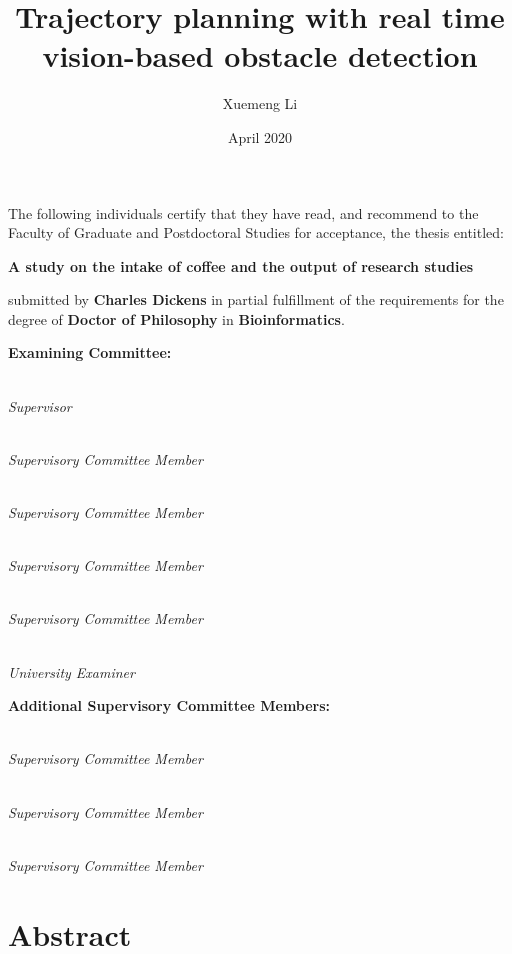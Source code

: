 \documentclass[
  oneside]{ubcthesis}
\title{Trajectory planning with real time vision-based obstacle detection}
\author{Xuemeng Li}
\date{April 2020}
\begin{document}
\maketitle


\noindent The following individuals certify that they have read,
and recommend to the Faculty of Graduate and Postdoctoral Studies
for acceptance, the thesis entitled:

\begin{center}
{\large \textbf{A study on the intake of coffee and the output of research studies}}
\end{center}

submitted by \textbf{Charles Dickens} in partial fulfillment of the requirements for the degree of \textbf{Doctor of Philosophy} in \textbf{Bioinformatics}.%
\par\bigskip%

\noindent\textbf{Examining Committee:}%
\par\medskip{}\\\emph{Supervisor}
\par\medskip{}\\\emph{Supervisory Committee Member}
\par\medskip{}\\\emph{Supervisory Committee Member}
\par\medskip{}\\\emph{Supervisory Committee Member}
\par\medskip{}\\\emph{Supervisory Committee Member}
\par\medskip{}\\\emph{University Examiner}
\par\bigskip%
\noindent\textbf{Additional Supervisory Committee Members:}%
\par\medskip{}\\\emph{Supervisory Committee Member}
\par\medskip{}\\\emph{Supervisory Committee Member}
\par\medskip{}\\\emph{Supervisory Committee Member}
\cleardoublepage

\chapter{Abstract}
\end{document}
